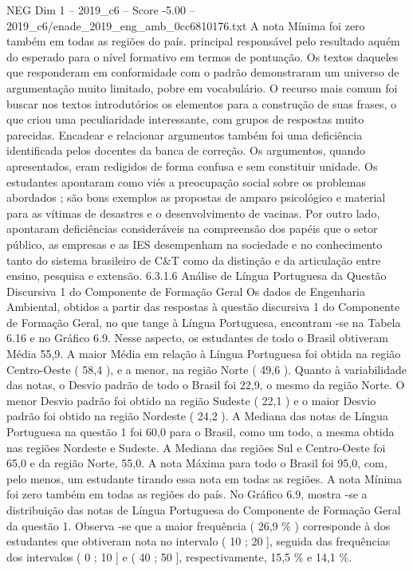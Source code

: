 \begin{textsample}{NEG Dim 1 – 2019\_c6 – Score -5.00 – 2019\_c6/enade\_2019\_eng\_amb\_0cc6810176.txt}
A nota Mínima foi zero também em todas as regiões do país. principal responsável pelo resultado aquém do esperado para o nível formativo em termos de pontuação.
Os textos daqueles que responderam em conformidade com o padrão demonstraram um universo de argumentação muito limitado, pobre em vocabulário.
O recurso mais comum foi buscar nos textos introdutórios os elementos para a construção de suas frases, o que criou uma peculiaridade interessante, com grupos de respostas muito parecidas.
Encadear e relacionar argumentos também foi uma deficiência identificada pelos docentes da banca de correção.
Os argumentos, quando apresentados, eram redigidos de forma confusa e sem constituir unidade.
Os estudantes apontaram como viés a preocupação social sobre os problemas abordados ; são bons exemplos as propostas de amparo psicológico e material para as vítimas de desastres e o desenvolvimento de vacinas.
Por outro lado, apontaram deficiências consideráveis na compreensão dos papéis que o setor público, as empresas e as IES desempenham na sociedade e no conhecimento tanto do sistema brasileiro de C\&T como da distinção e da articulação entre ensino, pesquisa e extensão. 6.3.1.6 Análise de Língua Portuguesa da Questão Discursiva 1 do Componente de Formação Geral Os dados de Engenharia Ambiental, obtidos a partir das respostas à questão discursiva 1 do Componente de Formação Geral, no que tange à Língua Portuguesa, encontram -se na Tabela 6.16 e no Gráfico 6.9.
Nesse aspecto, os estudantes de todo o Brasil obtiveram Média 55,9.
A maior Média em relação à Língua Portuguesa foi obtida na região Centro-Oeste ( 58,4 ), e a menor, na região Norte ( 49,6 ).
Quanto à variabilidade das notas, o Desvio padrão de todo o Brasil foi 22,9, o mesmo da região Norte.
O menor Desvio padrão foi obtido na região Sudeste ( 22,1 ) e o maior Desvio padrão foi obtido na região Nordeste ( 24,2 ).
A Mediana das notas de Língua Portuguesa na questão 1 foi 60,0 para o Brasil, como um todo, a mesma obtida nas regiões Nordeste e Sudeste.
A Mediana das regiões Sul e Centro-Oeste foi 65,0 e da região Norte, 55,0.
A nota Máxima para todo o Brasil foi 95,0, com, pelo menos, um estudante tirando essa nota em todas as regiões.
A nota Mínima foi zero também em todas as regiões do país.
No Gráfico 6.9, mostra -se a distribuição das notas de Língua Portuguesa do Componente de Formação Geral da questão 1.
Observa -se que a maior frequência ( 26,9 \% ) corresponde à dos estudantes que obtiveram nota no intervalo ( 10 ; 20 ], seguida das frequências dos intervalos ( 0 ; 10 ] e ( 40 ; 50 ], respectivamente, 15,5 \% e 14,1 \%.

\end{textsample}
